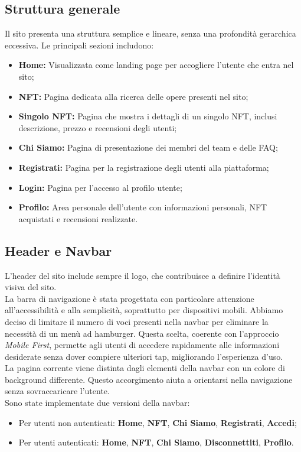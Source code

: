 \documentclass[10pt]{article}
\begin{document}
\subsection{Struttura generale}
Il sito presenta una struttura semplice e lineare, senza una profondità gerarchica eccessiva. Le principali sezioni includono:
\begin{itemize}
\item \textbf{Home:} Visualizzata come landing page per accogliere l'utente che entra nel sito;
\item \textbf{NFT:} Pagina dedicata alla ricerca delle opere presenti nel sito;
\item \textbf{Singolo NFT:} Pagina che mostra i dettagli di un singolo NFT, inclusi descrizione, prezzo e recensioni degli utenti;
\item \textbf{Chi Siamo:} Pagina di presentazione dei membri del team e delle FAQ;
\item \textbf{Registrati:} Pagina per la registrazione degli utenti alla piattaforma;
\item \textbf{Login:} Pagina per l'accesso al profilo utente;
\item \textbf{Profilo:} Area personale dell'utente con informazioni personali, NFT acquistati e recensioni realizzate.
\end{itemize}

\subsection{Header e Navbar}
L'header del sito include sempre il logo, che contribuisce a definire l’identità visiva del sito.\\
La barra di navigazione è stata progettata con particolare attenzione all'accessibilità e alla semplicità, soprattutto per dispositivi mobili. Abbiamo deciso di limitare il numero di voci presenti nella navbar per eliminare la necessità di un menù ad hamburger. Questa scelta, coerente con l'approccio \textit{Mobile First}, permette agli utenti di accedere rapidamente alle informazioni desiderate senza dover compiere ulteriori tap, migliorando l’esperienza d’uso.\\
La pagina corrente viene distinta dagli elementi della navbar con un colore di background differente. Questo accorgimento aiuta a orientarsi nella navigazione senza sovraccaricare l'utente.\\

Sono state implementate due versioni della navbar:
\begin{itemize}
\item Per utenti non autenticati: \textbf{Home}, \textbf{NFT}, \textbf{Chi Siamo}, \textbf{Registrati}, \textbf{Accedi};
\item Per utenti autenticati: \textbf{Home}, \textbf{NFT}, \textbf{Chi Siamo}, \textbf{Disconnettiti}, \textbf{Profilo}.
\end{itemize}
\end{document}
